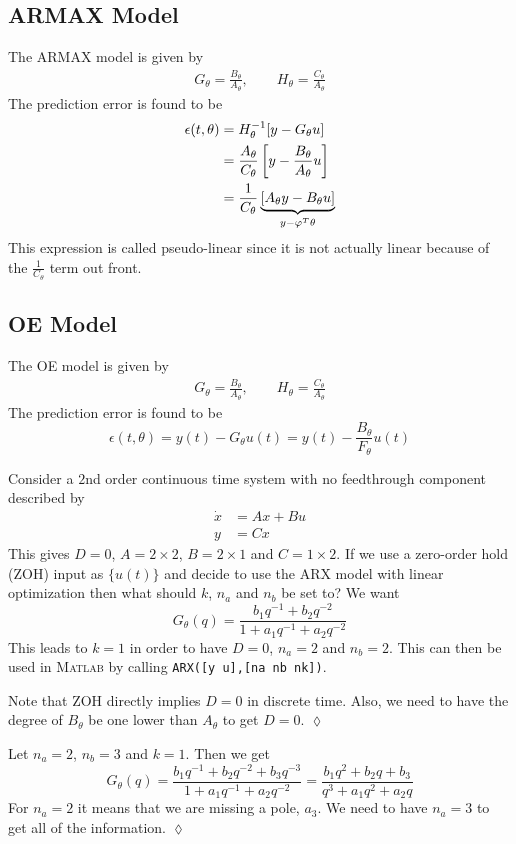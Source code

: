 \subsection{ARMAX Model}
The ARMAX model is given by
\begin{align*}
G_\theta = \frac{B_\theta}{A_\theta}, \qquad H_\theta = \frac{C_\theta}{A_\theta}
\end{align*}
The prediction error is found to be
\begin{align*}
\epsilon(t,\theta) &= H_\theta^{-1}[y-G_\theta u] \\
&= \frac{A_\theta}{C_\theta}\left[y-\frac{B_\theta}{A_\theta}u\right] \\
&= \frac{1}{C_\theta}\underbrace{\left[A_\theta y-B_\theta u\right]}_{y-\varphi^T\theta}
\end{align*}
This expression is called pseudo-linear since it is not actually linear because of the $\frac{1}{C_\theta}$ term out front.

\subsection{OE Model}
The OE model is given by
\begin{align*}
G_\theta = \frac{B_\theta}{A_\theta}, \qquad H_\theta = \frac{C_\theta}{A_\theta}
\end{align*}
The prediction error is found to be
$$\epsilon(t,\theta) = y(t)-G_\theta u(t) = y(t)-\frac{B_\theta}{F_\theta}u(t)$$

\begin{example}
Consider a $2$nd order continuous time system with no feedthrough component described by
\begin{align*}
\dot{x} &= Ax + Bu \\
y &= Cx
\end{align*}
This gives $D=0$, $A=2\times 2$, $B=2\times 1$ and $C=1\times 2$. If we use a zero-order hold (ZOH) input as $\{u(t)\}$ and decide to use the ARX model with linear optimization then what should $k$, $n_a$ and $n_b$ be set to? We want
$$G_\theta(q) = \frac{b_1q^{-1}+b_2q^{-2}}{1+a_1q^{-1}+a_2q^{-2}}$$
This leads to $k=1$ in order to have $D=0$, $n_a=2$ and $n_b=2$. This can then be used in \textsc{Matlab} by calling \texttt{ARX([y u],[na nb nk])}.

Note that ZOH directly implies $D=0$ in discrete time. Also, we need to have the degree of $B_\theta$ be one lower than $A_\theta$ to get $D=0$.
$\lozenge$
\end{example}

\begin{example}
Let $n_a=2$, $n_b=3$ and $k=1$. Then we get
$$G_\theta(q) = \frac{b_1q^{-1}+b_2q^{-2}+b_3q^{-3}}{1+a_1q^{-1}+a_2q^{-2}} = \frac{b_1q^2+b_2q+b_3}{q^3+a_1q^2+a_2q}$$
For $n_a=2$ it means that we are missing a pole, $a_3$. We need to have $n_a=3$ to get all of the information.
$\lozenge$
\end{example}

